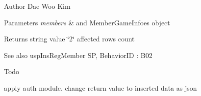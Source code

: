 \begin{DoxyAuthor}{Author}
Dae Woo Kim 
\end{DoxyAuthor}

\begin{DoxyParams}{Parameters}
{\em members} & and Member\+Game\+Infoes object \\
\hline
\end{DoxyParams}
\begin{DoxyReturn}{Returns}
string value \char`\"{}2\char`\"{} affected rows count 
\end{DoxyReturn}
\begin{DoxySeeAlso}{See also}
usp\+Ins\+Reg\+Member SP, Behavior\+ID \+: B02 
\end{DoxySeeAlso}
\begin{DoxyRefDesc}{Todo}
\item[\hyperlink{a00001__todo000009}{Todo}]apply auth module. change return value to inserted data as json \end{DoxyRefDesc}
